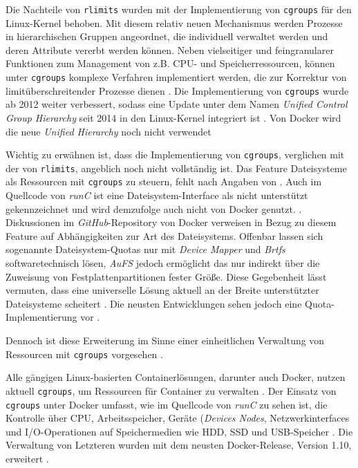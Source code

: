 \documentclass[../main.tex]{subfiles}
\begin{document}
		Die Nachteile von \texttt{\acrshort{rlimits}} wurden mit der Implementierung von \texttt{\acrshort{cgroups}} für den Linux-Kernel behoben. Mit diesem relativ neuen Mechanismus werden Prozesse in hierarchischen Gruppen angeordnet, die individuell verwaltet werden und deren Attribute vererbt werden können. Neben vielseitiger und feingranularer Funktionen zum Management von z.B. \acrshort{CPU}- und Speicherressourcen, können unter \texttt{\acrshort{cgroups}} komplexe Verfahren implementiert werden, die zur Korrektur von limitüberschreitender Prozesse dienen \cite{cgroupsRedhat}. Die Implementierung von \texttt{\acrshort{cgroups}} wurde ab 2012 weiter verbessert, sodass eine Update unter dem Namen \emph{Unified Control Group Hierarchy} seit 2014 in den Linux-Kernel integriert ist \cite{cgroupsFixing}\cite{cgroupsUniHierarchy}. Von Docker wird die neue \emph{Unified Hierarchy} noch nicht verwendet \cite{ https://github.com/docker/docker/issues/16238 }

		Wichtig zu erwähnen ist, dass die Implementierung von \texttt{\acrshort{cgroups}}, verglichen mit der von \texttt{\acrshort{rlimits}}, angeblich noch nicht vollständig ist. Das Feature Dateisysteme als Ressourcen mit \texttt{\acrshort{cgroups}} zu steuern, fehlt nach Angaben von \cite[S.19]{dockerSec2}. Auch im Quellcode von \emph{runC} ist eine Dateisystem-Interface als \glqq{}nicht unterstützt\grqq{} gekennzeichnet und wird demzufolge auch nicht von Docker genutzt. \cite{githubRunCCgroups}. Diskussionen im \emph{GitHub}-Repository von Docker verweisen in Bezug zu diesem Feature auf Abhängigkeiten zur Art des Dateisystems. Offenbar lassen sich sogenannte Dateisystem-Quotas nur mit \emph{Device Mapper} und \emph{Brtfs} softwaretechnisch lösen, \emph{AuFS} jedoch ermöglicht das nur indirekt über die Zuweisung von Festplattenpartitionen fester Größe. Diese Gegebenheit lässt vermuten, dass eine universelle Lösung aktuell an der Breite unterstützter Dateisysteme scheitert \cite{githubDockerIssueFsQuota}. Die neusten Entwicklungen sehen jedoch eine Quota-Implementierung vor \cite{githubDockerPullBrtfs}.

		Dennoch ist diese Erweiterung im Sinne einer einheitlichen Verwaltung von Ressourcen mit \texttt{\acrshort{cgroups}} vorgesehen \cite[S.16+19]{dockerSec2}.

		Alle gängigen Linux-basierten Containerlösungen, darunter auch Docker, nutzen aktuell \texttt{\acrshort{cgroups}}, um Ressourcen für Container zu verwalten \cite[S.16]{dockerSec2}. Der Einsatz von \texttt{\acrshort{cgroups}} unter Docker umfasst, wie im Quellcode von \emph{runC} zu sehen ist, die Kontrolle über \acrshort{CPU}, Arbeitsspeicher, Geräte (\emph{Devices Nodes}, Netzwerkinterfaces und \acrshort{I/O}-Operationen auf Speichermedien wie \acrshort{HDD}, \acrshort{SSD} und \acrshort{USB}-Speicher \cite{cgroupsRedhat}\cite{githubRunCCgroups}. Die Verwaltung von Letzteren wurden mit dem neusten Docker-Release, Version 1.10, erweitert \cite{https://blog.docker.com/2016/02/docker-1-10/}.
\end{document}

